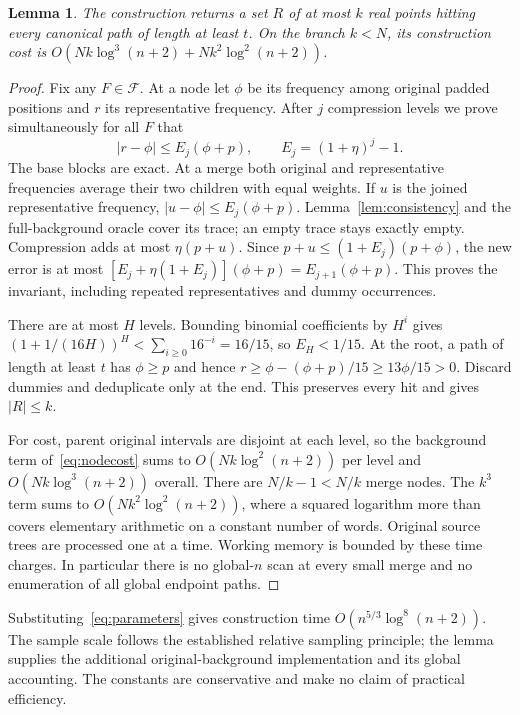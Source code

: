 \documentclass[acmsmall,11pt,nonacm,natbib=false]{acmart}
\newtheorem{lemma}[theorem]{Lemma}
\begin{document}
\begin{lemma}\label{lem:net}
The construction returns a set $R$ of at most $k$ real points hitting every
canonical path of length at least $t$. On the branch $k<N$, its construction
cost is $O(Nk\log^3(n+2)+Nk^2\log^2(n+2))$.
\end{lemma}
\begin{proof}
Fix any $F\in\mathcal F$. At a node let $\phi$ be its frequency among
original padded positions and $r$ its representative frequency. After
$j$ compression levels we prove simultaneously for all $F$ that
\begin{equation}\label{eq:invariant}
 |r-\phi|\leq E_j(\phi+p),\qquad E_j=(1+\eta)^j-1.
\end{equation}
The base blocks are exact. At a merge both original and representative
frequencies average their two children with equal weights. If $u$ is the
joined representative frequency, $|u-\phi|\leq E_j(\phi+p)$.
Lemma~\ref{lem:consistency} and the full-background oracle cover its trace;
an empty trace stays exactly empty. Compression adds at most $\eta(p+u)$.
Since $p+u\leq(1+E_j)(p+\phi)$, the new error is at most
$[E_j+\eta(1+E_j)](\phi+p)=E_{j+1}(\phi+p)$. This proves the invariant,
including repeated representatives and dummy occurrences.

There are at most $H$ levels. Bounding binomial coefficients by $H^i$ gives
$(1+1/(16H))^H<\sum_{i\geq0}16^{-i}=16/15$, so $E_H<1/15$.
At the root, a path of length at least $t$ has $\phi\geq p$ and hence
$r\geq\phi-(\phi+p)/15\geq13\phi/15>0$. Discard dummies and deduplicate
only at the end. This preserves every hit and gives $|R|\leq k$.

For cost, parent original intervals are disjoint at each level, so the
background term of~\eqref{eq:nodecost} sums to $O(Nk\log^2(n+2))$ per
level and $O(Nk\log^3(n+2))$ overall. There are $N/k-1<N/k$ merge nodes.
The $k^3$ term sums to $O(Nk^2\log^2(n+2))$, where a squared logarithm
more than covers elementary arithmetic on a constant number of words.
Original source trees are processed one at a time. Working memory is
bounded by these time charges. In particular there is no global-$n$ scan
at every small merge and no enumeration of all global endpoint paths.
\end{proof}

Substituting~\eqref{eq:parameters} gives construction time
$O(n^{5/3}\log^8(n+2))$. The sample scale follows the established relative
sampling principle; the lemma supplies the additional original-background
implementation and its global accounting. The constants are conservative
and make no claim of practical efficiency.
\end{document}
